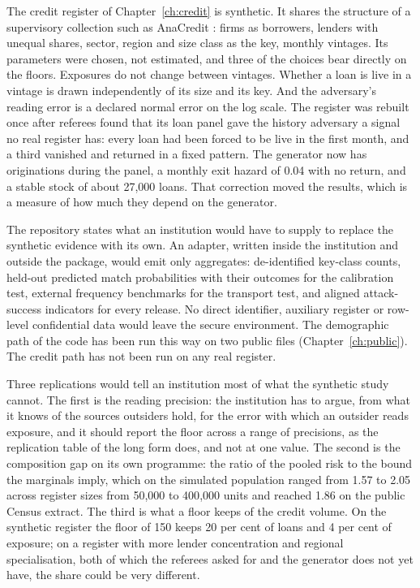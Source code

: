 The credit register of Chapter~\ref{ch:credit} is synthetic. It shares the structure
of a supervisory collection such as AnaCredit \citep{israel2017,ecb2022}: firms as
borrowers, lenders with unequal shares, sector, region and size class as the key,
monthly vintages. Its parameters were chosen, not estimated, and three of the choices
bear directly on the floors. Exposures do not change between vintages. Whether a loan
is live in a vintage is drawn independently of its size and its key. And the
adversary's reading error is a declared normal error on the log scale. The register
was rebuilt once after referees found that its loan panel gave the history adversary
a signal no real register has: every loan had been forced to be live in the first
month, and a third vanished and returned in a fixed pattern. The generator now has
originations during the panel, a monthly exit hazard of 0.04 with no return, and a
stable stock of about 27{,}000 loans.
That correction moved the results, which is a measure of how much they depend on the
generator.

The repository states what an institution would have to supply to replace the
synthetic evidence with its own. An adapter, written inside the institution and
outside the package, would emit only aggregates: de-identified key-class counts,
held-out predicted match probabilities with their outcomes for the calibration test,
external frequency benchmarks for the transport test, and aligned attack-success
indicators for every release. %
No direct identifier, auxiliary register or row-level confidential data would leave
the secure environment. The demographic path of the code has been run this way on two
public files (Chapter~\ref{ch:public}). The credit path has not been run on any real
register.

Three replications would tell an institution most of what the synthetic study cannot.
The first is the reading precision: the institution has to argue, from what it knows
of the sources outsiders hold, for the error with which an outsider reads exposure,
and it should report the floor across a range of precisions, as the replication
table of the long form does, and not at one value. The second is
the composition gap on its own programme: the ratio of the pooled risk to the bound the
marginals imply, which on the simulated population ranged from 1.57 to 2.05 across
register sizes from 50{,}000 to 400{,}000 units and reached 1.86 on the public Census
extract. %
The third is what a floor keeps of the credit volume. On the synthetic register the
floor of 150 keeps 20 per cent of loans and 4 per cent of exposure; on a register
with more lender concentration and regional specialisation, both of which the referees
asked for and the generator does not yet have, the share could be very different.

